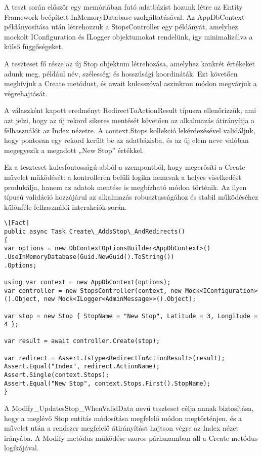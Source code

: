A teszt során először egy memóriában futó adatbázist hozunk létre az Entity Framework beépített InMemoryDatabase szolgáltatásával.  Az AppDbContext példányosítása után létrehozzuk a StopsController egy példányát, amelyhez mockolt IConfiguration és ILogger objektumokat rendelünk, így minimalizálva a külső függőségeket.

A teszteset fő része az új Stop objektum létrehozása, amelyhez konkrét értékeket adunk meg, például név, szélességi és hosszúsági koordináták. Ezt követően meghívjuk a Create metódust, és await kulcsszóval aszinkron módon megvárjuk a végrehajtását.

A válaszként kapott eredményt RedirectToActionResult típusra ellenőrizzük, ami azt jelzi, hogy az új rekord sikeres mentését követően az alkalmazás átirányítja a felhasználót az Index nézetre. A context.Stops kollekció lekérdezésével validáljuk, hogy pontosan egy rekord került be az adatbázisba, és az új elem neve valóban megegyezik a megadott „New Stop” értékkel.

Ez a teszteset kulcsfontosságú abból a szempontból, hogy megerősíti a Create művelet működését: a kontrolleren belüli logika nemcsak a helyes viselkedést produkálja, hanem az adatok mentése is megbízható módon történik. Az ilyen típusú validáció hozzájárul az alkalmazás robusztusságához és stabil működéséhez különféle felhasználói interakciók során.

\begin{lstlisting}
\[Fact]
public async Task Create\_AddsStop\_AndRedirects()
{
var options = new DbContextOptionsBuilder<AppDbContext>()
.UseInMemoryDatabase(Guid.NewGuid().ToString())
.Options;

using var context = new AppDbContext(options);
var controller = new StopsController(context, new Mock<IConfiguration>().Object, new Mock<ILogger<AdminMessage>>().Object);

var stop = new Stop { StopName = "New Stop", Latitude = 3, Longitude = 4 };

var result = await controller.Create(stop);

var redirect = Assert.IsType<RedirectToActionResult>(result);
Assert.Equal("Index", redirect.ActionName);
Assert.Single(context.Stops);
Assert.Equal("New Stop", context.Stops.First().StopName);
}
\end{lstlisting}

A Modify\_UpdatesStop\_WhenValidData nevű teszteset célja annak biztosítása, hogy a meglévő Stop entitás módosítása megfelelő módon megtörténjen, és a művelet után a rendszer megfelelő átirányítást hajtson végre az Index nézet irányába. A Modify metódus működése szoros párhuzamban áll a Create metódus logikájával.

